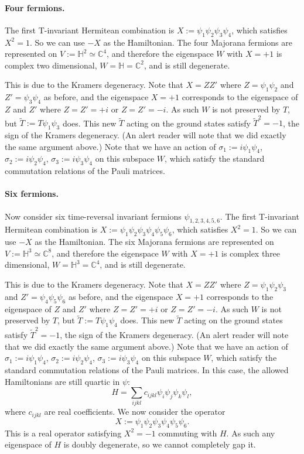 \documentclass[12pt]{article}
\numberwithin{equation}{section}
\numberwithin{figure}{section}
\theoremstyle{remark}
\def\bC{\mathbb{C}}
\def\bH{\mathbb{H}}
\begin{document}
\paragraph{Four fermions.}
The first T-invariant Hermitean combination is $X:=\psi_1\psi_2\psi_3\psi_4$,
which satisfies $X^2=1$.
So we can use $-X$ as the Hamiltonian.
The four Majorana fermions are represented on $V:=\bH^2\simeq \bC^4$,
and therefore the eigenspace $W$ with $X=+1$ is complex two dimensional, $W=\bH=\bC^2$,
and is still degenerate.

This is due to the Kramers degeneracy. 
Note that $X=ZZ'$ where $Z=\psi_1\psi_2$ and $Z'=\psi_3\psi_4$ as before,
and the eigenspace $X=+1$ corresponds to the eigenspace of $Z$ and $Z'$ 
where $Z=Z'=+i$ or $Z=Z'=-i$. 
As such $W$ is not preserved by $T$, but $\tilde T:=T\psi_1\psi_3$ does.
This new $\tilde T$ acting on the ground states satisfy $\tilde T^2=-1$,
the sign of the Kramers degeneracy.
(An alert reader will note that we did exactly the same argument above.)
Note that we have an action of $\sigma_1:=i\psi_1\psi_4$, 
$\sigma_2:=i\psi_2\psi_4$, $\sigma_3:=i\psi_3\psi_4$ on this subspace $W$,
which satisfy the standard commutation relations of the Pauli matrices.

\paragraph{Six fermions.}
Now consider six time-reversal invariant fermions $\psi_{1,2,3,4,5,6}$.
The first T-invariant Hermitean combination is $X:=\psi_1\psi_2\psi_3\psi_4\psi_5\psi_6$,
which satisfies $X^2=1$.
So we can use $-X$ as the Hamiltonian.
The six Majorana fermions are represented on $V:=\bH^3\simeq \bC^8$,
and therefore the eigenspace $W$ with $X=+1$ is complex three dimensional, $W=\bH^3=\bC^4$,
and is still degenerate.

This is due to the Kramers degeneracy.
Note that $X=ZZ'$ where $Z=\psi_1\psi_2\psi_3$ and $Z'=\psi_4\psi_5\psi_6$ as before,
and the eigenspace $X=+1$ corresponds to the eigenspace of $Z$ and $Z'$
where $Z=Z'=+i$ or $Z=Z'=-i$.
As such $W$ is not preserved by $T$, but $\tilde T:=T\psi_1\psi_4$ does.
This new $\tilde T$ acting on the ground states satisfy $\tilde T^2=-1$,
the sign of the Kramers degeneracy.
(An alert reader will note that we did exactly the same argument above.)
Note that we have an action of $\sigma_1:=i\psi_1\psi_4$,
$\sigma_2:=i\psi_2\psi_4$, $\sigma_3:=i\psi_3\psi_4$ on this subspace $W$,
which satisfy the standard commutation relations of the Pauli matrices.
\fi
In this case, the allowed Hamiltonians are still quartic in $\psi$: \begin{equation}
H= \sum_{ijkl} c_{ijkl} \psi_i \psi_j \psi_k \psi_l,
\end{equation} where $c_{ijkl}$ are real coefficients.
We now consider the operator \begin{equation}
  X:=\psi_1\psi_2\psi_3\psi_4\psi_5\psi_6.
\end{equation}
This is a real operator satisfying $X^2=-1$ commuting with $H$.
As such any eigenspace of $H$ is doubly degenerate,
so we cannot completely gap it.
\end{document}

